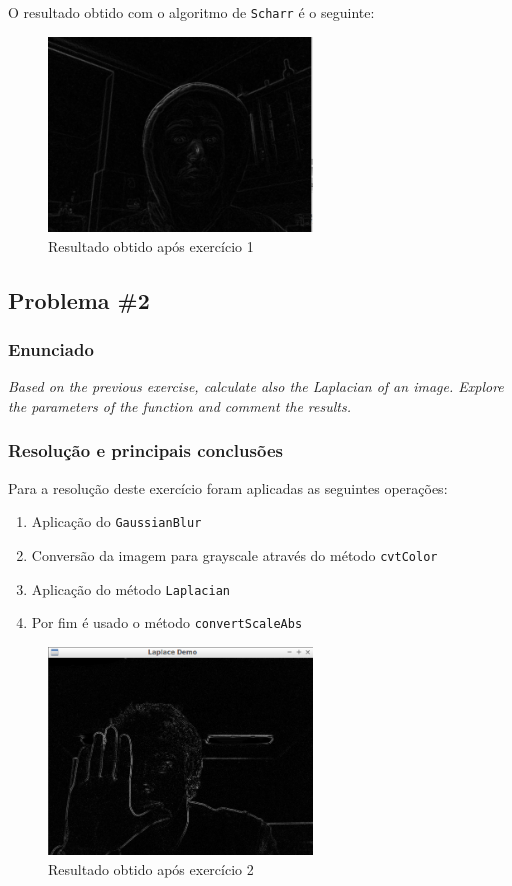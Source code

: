 \documentclass[portuguese, times, mirror]{revdetua}
\begin{document}
O resultado obtido com o algoritmo de \texttt{Scharr} é o seguinte: 

\begin{figure}[ht!]
\centering
\includegraphics[width=70mm]{img/ex1.png}
\caption{Resultado obtido após exercício 1}
\end{figure}




\subsection{Problema \#2}

\subsubsection{Enunciado}
\textit{Based on the previous exercise, calculate also the Laplacian of an image. Explore the parameters
of the function and comment the results.}

\subsubsection{Resolução e principais conclusões}


Para a resolução deste exercício foram aplicadas as seguintes operações:
\begin{enumerate}
    \item Aplicação do \texttt{GaussianBlur}
    \item Conversão da imagem para grayscale através do método \texttt{cvtColor}
    \item Aplicação do método \texttt{Laplacian} 
    \item Por fim é usado o método \texttt{convertScaleAbs}
\end{enumerate}



\begin{figure}[ht!]
\centering
\includegraphics[width=70mm]{img/ex2.png}
\caption{Resultado obtido após exercício 2}
\end{figure}
\end{document}
